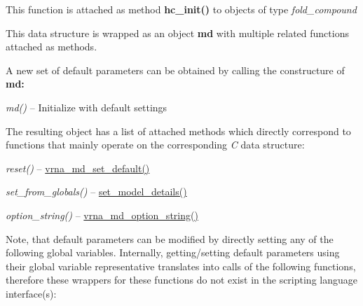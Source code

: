 \begin{DoxyRefList}
\item[\label{wrappers__wrappers000004}%
\hypertarget{wrappers__wrappers000004}{}%
Global \hyperlink{group__hard__constraints_ga36ff456c43bf920629cee5a236e4f0ff}{vrna\+\_\+hc\+\_\+init} (vrna\+\_\+fold\+\_\+compound\+\_\+t $\ast$vc)]This function is attached as method {\bfseries hc\+\_\+init()} to objects of type {\itshape fold\+\_\+compound}  
\item[\label{wrappers__wrappers000043}%
\hypertarget{wrappers__wrappers000043}{}%
Class \hyperlink{structvrna__md__s}{vrna\+\_\+md\+\_\+s} ]This data structure is wrapped as an object {\bfseries md} with multiple related functions attached as methods.

A new set of default parameters can be obtained by calling the constructure of {\bfseries md\+:} ~\newline

\begin{DoxyItemize}
\item {\itshape md()} -- Initialize with default settings
\end{DoxyItemize}

The resulting object has a list of attached methods which directly correspond to functions that mainly operate on the corresponding {\itshape C} data structure\+:~\newline

\begin{DoxyItemize}
\item {\itshape reset()} -- \hyperlink{group__model__details_ga8ac6ff84936282436f822644bf841f66}{vrna\+\_\+md\+\_\+set\+\_\+default()}
\item {\itshape set\+\_\+from\+\_\+globals()} -- \hyperlink{group__model__details_gabad896c3650d420f3f3ddefc69e2bceb}{set\+\_\+model\+\_\+details()}
\item {\itshape option\+\_\+string()} -- \hyperlink{group__model__details_ga3a7469f0725a849af6ba61a57dfd60ce}{vrna\+\_\+md\+\_\+option\+\_\+string()}
\end{DoxyItemize}

Note, that default parameters can be modified by directly setting any of the following global variables. Internally, getting/setting default parameters using their global variable representative translates into calls of the following functions, therefore these wrappers for these functions do not exist in the scripting language interface(s)\+:


\end{DoxyRefList}
